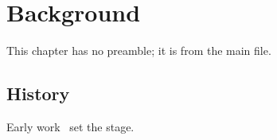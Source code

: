 \chapter{Background}\label{ch:bg}

This chapter has no preamble; it is \verb|| from the main file.

\section{History}
Early work~\cite{a,b} set the stage.


\clearpage
